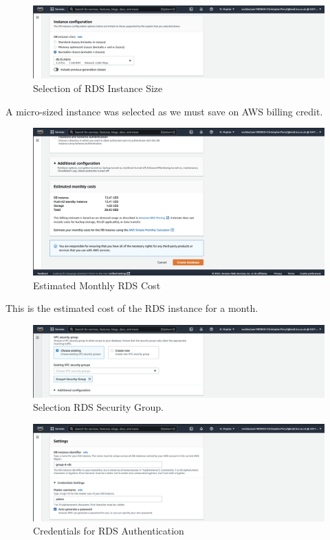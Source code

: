 \begin{figure}[!htbp]
    \centering
    \includegraphics[width=\textwidth]{resources/rds/rds-instance-config.png}
    \caption{Selection of RDS Instance Size}
    \label{fig:rds-instance-conf}
\end{figure}

A micro-sized instance was selected as we must save on AWS billing credit.

\begin{figure}[!htbp]
    \centering
    \includegraphics[width=\textwidth]{resources/rds/rds-monthly-costs.png}
    \caption{Estimated Monthly RDS Cost}
    \label{fig:rds-costs}
\end{figure}

This is the estimated cost of the RDS instance for a month.

\begin{figure}[!htbp]
    \centering
    \includegraphics[width=\textwidth]{resources/rds/rds-security-group.png}
    \caption{Selection RDS Security Group.}
    \label{fig:rds-security}
\end{figure}

\begin{figure}[!htbp]
    \centering
    \includegraphics[width=\textwidth]{resources/rds/rds-settings.png}
    \caption{Credentials for RDS Authentication}
    \label{fig:rds-settings}
\end{figure}

